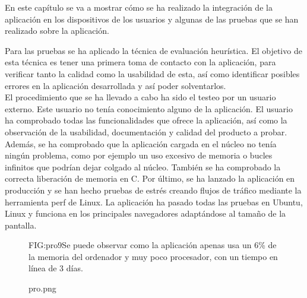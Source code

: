 En este capítulo se va a mostrar cómo se ha realizado la integración de la aplicación en los dispositivos de los usuarios y algunas de las pruebas que se han realizado sobre la aplicación.

Para las pruebas se ha aplicado la técnica de evaluación heurística. El objetivo de esta técnica es tener una primera toma de contacto con la aplicación, para verificar tanto la calidad como la usabilidad de esta, así como identificar posibles errores en la aplicación desarrollada y así poder solventarlos.
\\El procedimiento que se ha llevado a cabo ha sido el testeo por un usuario externo. Este usuario no tenía conocimiento alguno de la aplicación. El usuario ha comprobado todas las funcionalidades que ofrece la aplicación, así como la observación de la usabilidad, documentación y calidad del producto a probar.
Además, se ha comprobado que la aplicación cargada en el núcleo no tenía ningún problema, como por ejemplo un uso excesivo de memoria o bucles infinitos que podrían dejar colgado al núcleo. También se ha comprobado la correcta liberación de memoria en C. Por último, se ha lanzado la aplicación en producción y se han hecho pruebas de estrés creando flujos de tráfico mediante la herramienta perf de Linux. La aplicación ha pasado todas las pruebas en Ubuntu, Linux y funciona en los principales navegadores adaptándose al tamaño de la pantalla.
\begin{figure}[Aplicación en el administrador de tareas.]{FIG:pro9}{Se puede observar como la aplicación apenas usa un 6\% de la memoria del ordenador y muy poco procesador, con un tiempo en línea de 3 días.}
  \begin{image}{}{}{pro.png}
  \end{image}
\end{figure}
